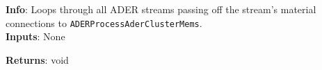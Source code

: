 \textbf{Info}: Loops through all ADER streams passing off the stream's material
connections to \texttt{ADERProcessAderClusterMems}.\\

\noindent \textbf{Inputs}: None

\noindent \textbf{Returns}: void
